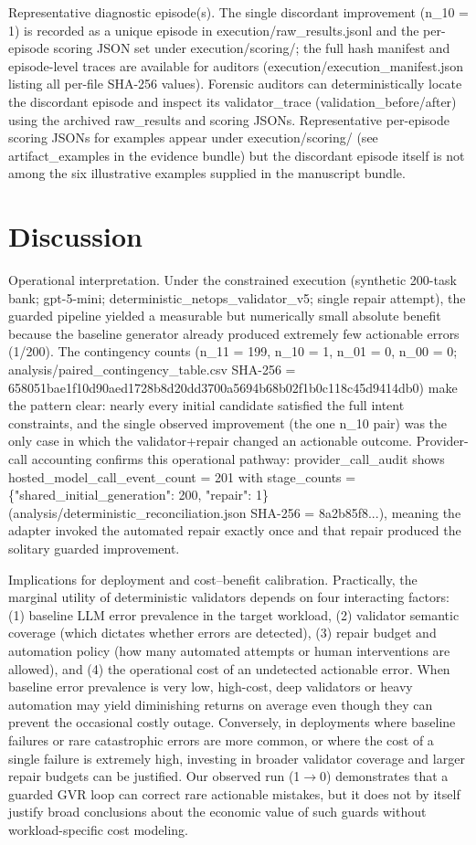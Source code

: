 \documentclass[conference]{IEEEtran}
\begin{document}
Representative diagnostic episode(s). The single discordant improvement (n\_10 = 1) is recorded as a unique episode in execution/raw\_results.jsonl and the per-episode scoring JSON set under execution/scoring/; the full hash manifest and episode-level traces are available for auditors (execution/execution\_manifest.json listing all per-file SHA-256 values). Forensic auditors can deterministically locate the discordant episode and inspect its validator\_trace (validation\_before/after) using the archived raw\_results and scoring JSONs. Representative per-episode scoring JSONs for examples appear under execution/scoring/ (see artifact\_examples in the evidence bundle) but the discordant episode itself is not among the six illustrative examples supplied in the manuscript bundle.

\section{Discussion}
Operational interpretation. Under the constrained execution (synthetic 200-task bank; gpt-5-mini; deterministic\_netops\_validator\_v5; single repair attempt), the guarded pipeline yielded a measurable but numerically small absolute benefit because the baseline generator already produced extremely few actionable errors (1/200). The contingency counts (n\_11 = 199, n\_10 = 1, n\_01 = 0, n\_00 = 0; analysis/paired\_contingency\_table.csv SHA-256 = 658051bae1f10d90aed1728b8d20dd3700a5694b68b02f1b0c118c45d9414db0) make the pattern clear: nearly every initial candidate satisfied the full intent constraints, and the single observed improvement (the one n\_10 pair) was the only case in which the validator+repair changed an actionable outcome. Provider-call accounting confirms this operational pathway: provider\_call\_audit shows hosted\_model\_call\_event\_count = 201 with stage\_counts = \{"shared\_initial\_generation": 200, "repair": 1\} (analysis/deterministic\_reconciliation.json SHA-256 = 8a2b85f8...), meaning the adapter invoked the automated repair exactly once and that repair produced the solitary guarded improvement.

Implications for deployment and cost--benefit calibration. Practically, the marginal utility of deterministic validators depends on four interacting factors: (1) baseline LLM error prevalence in the target workload, (2) validator semantic coverage (which dictates whether errors are detected), (3) repair budget and automation policy (how many automated attempts or human interventions are allowed), and (4) the operational cost of an undetected actionable error. When baseline error prevalence is very low, high-cost, deep validators or heavy automation may yield diminishing returns on average even though they can prevent the occasional costly outage. Conversely, in deployments where baseline failures or rare catastrophic errors are more common, or where the cost of a single failure is extremely high, investing in broader validator coverage and larger repair budgets can be justified. Our observed run (1\ensuremath{\rightarrow}0) demonstrates that a guarded GVR loop can correct rare actionable mistakes, but it does not by itself justify broad conclusions about the economic value of such guards without workload-specific cost modeling.
\end{document}
